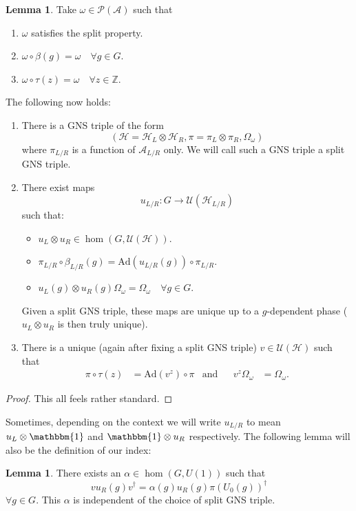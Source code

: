 \documentclass[12pt,a4paper,twoside]{article}
\newcommand{\UU}{\mathcal U}
\newcommand{\PP}{\mathcal P}
\newcommand{\HH}{\mathcal H}
\newcommand{\ZZ}{\mathbb Z}
\renewcommand{\AA}{\mathcal A}
\newcommand{\one}{\mathbbm{1}}
\newcommand{\Ad}{\textrm{Ad}}
\theoremstyle{definition}
\newtheorem{lemma}[theorem]{Lemma}
\numberwithin{equation}{section}
\begin{document}
\begin{lemma}
	Take $\omega\in\PP(\AA)$ such that
	\begin{enumerate}
		\item $\omega$ satisfies the split property.
		\item $\omega\circ\beta(g)=\omega\quad\forall g\in G$.
		\item $\omega\circ\tau(z)=\omega\quad\forall z\in\ZZ$.
	\end{enumerate}
	The following now holds:
	\begin{enumerate}
		\item There is a GNS triple of the form
		\begin{equation}
			(\HH=\HH_L\otimes\HH_R,\pi=\pi_L\otimes\pi_R,\Omega_\omega)
		\end{equation}
		where $\pi_{L/R}$ is a function of $\AA_{L/R}$ only. We will call such a GNS triple a split GNS triple.
		\item There exist maps
		\begin{equation}
			u_{L/R}:G\rightarrow\UU(\HH_{L/R})
		\end{equation}
		such that:
		\begin{itemize}
			\item $u_L\otimes u_R\in\hom(G,\UU(\HH))$.
			\item $\pi_{L/R}\circ \beta_{L/R}(g)=\Ad(u_{L/R}(g))\circ\pi_{L/R}$.
			\item $u_L(g)\otimes u_R(g)\Omega_\omega=\Omega_\omega\quad\forall g\in G$.
		\end{itemize}
		Given a split GNS triple, these maps are unique up to a $g$-dependent phase ($u_L\otimes u_R$ is then truly unique).
		\item There is a unique (again after fixing a split GNS triple) $v\in\UU(\HH)$ such that
		\begin{align}
			\pi\circ\tau(z)&=\Ad(v^z)\circ\pi&\text{and}&&v^z\Omega_\omega&=\Omega_\omega.
		\end{align}
	\end{enumerate}
\end{lemma}
\begin{proof}
	This all feels rather standard.
\end{proof}
Sometimes, depending on the context we will write $u_{L/R}$ to mean $u_L\otimes\one$ and $\one\otimes u_R$ respectively. The following lemma will also be the definition of our index:
\begin{lemma}
	There exists an $\alpha\in\hom(G,U(1))$ such that
	\begin{equation}
		v u_R(g)v^\dagger =\alpha(g) u_R(g)\pi(U_0(g))^\dagger
	\end{equation}
	$\forall g\in G$. This $\alpha$ is independent of the choice of split GNS triple.
\end{lemma}
\end{document}
